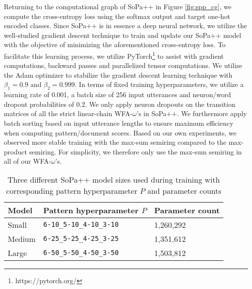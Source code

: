 Returning to the computational graph of SoPa++ in Figure \ref{fig:spp_cg}, we
compute the cross-entropy loss using the softmax output and target one-hot
encoded classes. Since SoPa++ is in essence a deep neural network, we utilize
the well-studied gradient descent technique to train and update our SoPa++ model
with the objective of minimizing the aforementioned cross-entropy loss. To
facilitate this learning process, we utilize
PyTorch\footnote{https://pytorch.org/} to assist with gradient computations,
backward passes and parallelized tensor computations. We utilize the Adam
optimizer \citep{DBLP:journals/corr/KingmaB14} to stabilize the gradient descent
learning technique with $\beta_1=0.9$ and $\beta_2=0.999$. In terms of fixed
training hyperparameters, we utilize a learning rate of 0.001, a batch size of
256 input utterances and neuron/word dropout probabilities of 0.2. We only apply
neuron dropouts on the transition matrices of all the strict linear-chain
WFA-$\omega$'s in SoPa++. We furthermore apply batch sorting based on input
utterance lengths to ensure maximum efficiency when computing pattern/document
scores. Based on our own experiments, we observed more stable training with the
max-sum semiring compared to the max-product semiring. For simplicity, we
therefore only use the max-sum semiring in all of our WFA-$\omega$'s.

\begin{table}[t!]
  \centering
  \begin{tabular}{lll}
    \toprule
    Model & Pattern hyperparameter $P$ & Parameter count \\
    \midrule
    Small & \texttt{6-10\_5-10\_4-10\_3-10} & 1,260,292 \\
    Medium & \texttt{6-25\_5-25\_4-25\_3-25} & 1,351,612  \\
    Large & \texttt{6-50\_5-50\_4-50\_3-50} & 1,503,812 \\
    \bottomrule
  \end{tabular}
  \caption{Three different SoPa++ model sizes used during training with
    corresponding pattern hyperparameter $P$ and parameter counts}
  \label{tab:model_types}
\end{table}

